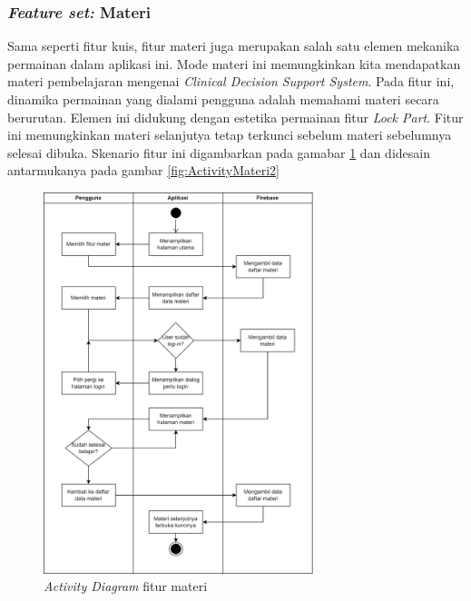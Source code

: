 \subsubsection{\textit{Feature set:} Materi}

Sama seperti fitur kuis, fitur materi juga merupakan salah satu elemen mekanika permainan dalam aplikasi ini.
Mode materi ini memungkinkan kita mendapatkan materi pembelajaran mengenai \textit{Clinical Decision Support System}.
Pada fitur ini, dinamika permainan yang dialami pengguna adalah memahami materi secara berurutan. Elemen ini didukung dengan estetika permainan fitur \textit{Lock Part}.
Fitur ini memungkinkan materi selanjutya tetap terkunci sebelum materi sebelumnya selesai dibuka. Skenario fitur ini digambarkan pada gamabar \ref*{Fig:ActivityMateri} dan didesain antarmukanya pada gambar \ref*{fig:ActivityMateri2}
\begin{figure}[H]
	\centering
	\includegraphics[width=0.7\textwidth]{contents/chapter-3/images/AD-materi.png}
	\caption{\textit{Activity Diagram} fitur materi }
	\label{Fig:ActivityMateri}
\end{figure}

